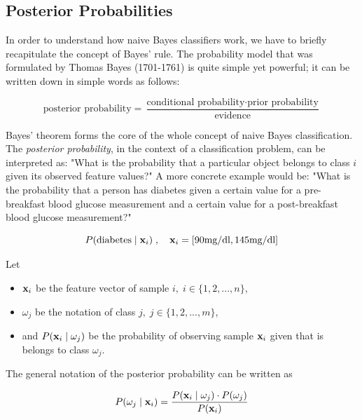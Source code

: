 \documentclass{article}
\begin{document}
\subsection{Posterior Probabilities}
\label{sec:posterior_probabilities_1}

In order to understand how naive Bayes classifiers work, we have to briefly recapitulate the concept of Bayes' rule.
The probability model that was formulated by Thomas Bayes (1701-1761) is quite simple yet powerful; it can be written down in simple words as follows:

\begin{equation} \text{posterior probability} = \frac{\text{conditional probability} \cdot \text{prior probability}}{\text{evidence}} \end{equation}

 Bayes' theorem forms the core of the whole concept of naive Bayes classification. The \emph{posterior probability}, in the context of a classification problem, can be interpreted as: "What is the probability that a particular object belongs to class $i$ given its observed feature values?" A more concrete example would be: "What is the probability that a person has diabetes given a certain value for a pre-breakfast blood glucose measurement and a certain value for a post-breakfast blood glucose measurement?"


\begin{equation}  P(\text{diabetes} \mid \textbf x_i) \;, \quad \textbf x_i = [90 \text{mg/dl}, 145 \text{mg/dl}] \end{equation}

 Let

\begin{itemize}
	\item $\textbf x_i$ be the feature vector of sample $i, \; i \in \{1, 2, ..., n\}$,
	\item $\omega_j$ be the notation of class $j, \; j \in \{1, 2, ..., m\}$, 
	\item and $P(\textbf x_i \mid \omega_j)$ be the probability of observing sample $\textbf x_i$ given that is belongs to class $\omega_j$.
\end{itemize}

 The general notation of the posterior probability can be written as

\begin{equation} P(\omega_j \mid \textbf x_i) = \frac{P(\textbf x_i \mid \omega_j) \cdot P(\omega_j)}{P(\textbf x_i)} \end{equation}
\end{document}
